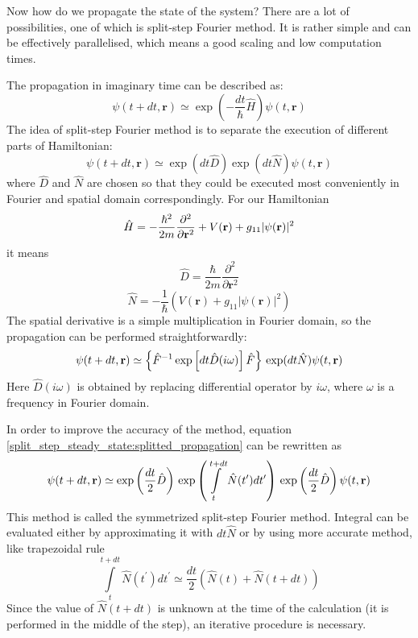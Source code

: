 \documentclass[12pt,notitlepage]{report}
\begin{document}
Now how do we propagate the state of the system? There are a lot of possibilities, one of which is split-step
Fourier method. It is rather simple and can be effectively parallelised, which means a good scaling and 
low computation times. 

The propagation in imaginary time can be described as:
\[ \psi(t + dt, \mathbf{r}) \simeq \exp \left( -\frac{dt}{\hbar} \hat{H} \right) \psi(t, \mathbf{r}) \]
The idea of split-step Fourier method is to separate the execution of different parts of Hamiltonian:
\begin{equation}
\label{split_step_steady_state:splitted_propagation}
\psi(t + dt, \mathbf{r}) \simeq \exp(dt \hat{D}) \exp(dt \hat{N}) \psi(t, \mathbf{r})
\end{equation}
where $\hat{D}$ and $\hat{N}$ are chosen so that they could be executed most conveniently in Fourier and spatial
domain correspondingly. For our Hamiltonian
\[ 
\hat{H} = -\frac{\hbar^2}{2m} \frac{\partial^2}{\partial \mathbf{r}^2} + \\
V(\mathbf{r}) + g_{11} \vert \psi(\mathbf{r}) \vert^2 
\]
it means
\[ \hat{D} = \frac{\hbar}{2m} \frac{\partial^2}{\partial \mathbf{r}^2} \]
\[ \hat{N} = -\frac{1}{\hbar} \left( V(\mathbf{r}) + g_{11} \vert \psi(\mathbf{r}) \vert^2 \right) \] 
The spatial derivative is a simple multiplication in Fourier domain, so the propagation can be performed 
straightforwardly:
\[ 
\psi(t + dt, \mathbf{r}) \simeq \left\{ \hat{F}^{-1} \exp \left[ dt \hat{D}(i\omega) \right] \hat{F} \right\} \\
\exp(dt \hat{N}) \psi(t, \mathbf{r}) 
\]
Here $\hat{D}(i\omega)$ is obtained by replacing differential operator by $i \omega$, where $\omega$ is a
frequency in Fourier domain.

In order to improve the accuracy of the method, equation \ref{split_step_steady_state:splitted_propagation}
can be rewritten as
\[
\psi(t + dt, \mathbf{r}) \simeq \exp \left( \frac{dt}{2} \hat{D} \right) \\
\exp \left( \int\limits^{t + dt}_t \hat{N} (t^\prime) dt^\prime \right) \\
\exp \left( \frac{dt}{2} \hat{D} \right) \psi(t, \mathbf{r})
\]
This method is called the symmetrized split-step Fourier method. Integral can be evaluated either by approximating it
with $dt\hat{N}$ or by using more accurate method, like trapezoidal rule
\[ \int\limits^{t + dt}_t \hat{N} (t^\prime) dt^\prime \simeq \frac{dt}{2} \left( \hat{N}(t) + \hat{N}(t + dt) \right) \]
Since the value of $\hat{N}(t + dt)$ is unknown at the time of the calculation (it is performed in the
middle of the step), an iterative procedure is necessary.
\end{document}
